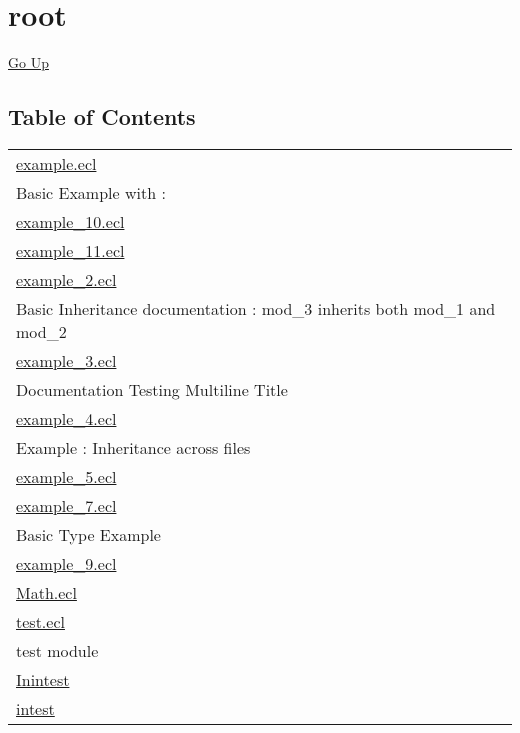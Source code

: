 \chapter*{\color{headtoc} root}
\hypertarget{ecldoc:toc:root}{}
\hyperlink{ecldoc:toc:}{Go Up}


\section*{Table of Contents}
{\renewcommand{\arraystretch}{1.5}
\begin{longtable}{|p{\textwidth}|}
\hline
\hyperlink{ecldoc:toc:example}{example.ecl} \\
Basic Example with : \\
\hline
\hyperlink{ecldoc:toc:example_10}{example\_10.ecl} \\
\hline
\hyperlink{ecldoc:toc:example_11}{example\_11.ecl} \\
\hline
\hyperlink{ecldoc:toc:example_2}{example\_2.ecl} \\
Basic Inheritance documentation : mod\_3 inherits both mod\_1 and mod\_2 \\
\hline
\hyperlink{ecldoc:toc:example_3}{example\_3.ecl} \\
Documentation Testing Multiline Title \\
\hline
\hyperlink{ecldoc:toc:example_4}{example\_4.ecl} \\
Example : Inheritance across files \\
\hline
\hyperlink{ecldoc:toc:example_5}{example\_5.ecl} \\
\hline
\hyperlink{ecldoc:toc:example_7}{example\_7.ecl} \\
Basic Type Example \\
\hline
\hyperlink{ecldoc:toc:example_9}{example\_9.ecl} \\
\hline
\hyperlink{ecldoc:toc:Math}{Math.ecl} \\
\hline
\hyperlink{ecldoc:toc:test}{test.ecl} \\
test module \\
\hline
\hyperlink{ecldoc:toc:root/Inintest}{Inintest} \\
\hline
\hyperlink{ecldoc:toc:root/intest}{intest} \\
\hline
\end{longtable}
}















